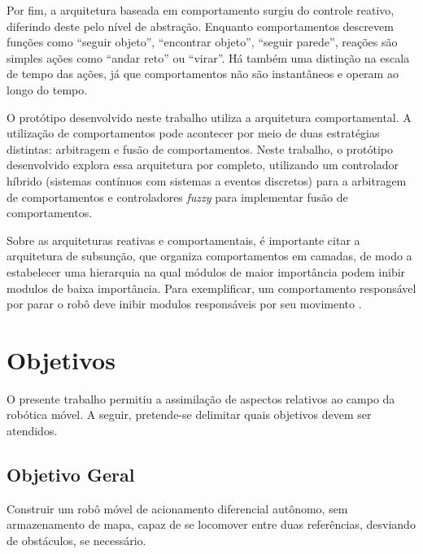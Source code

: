 Por fim, a arquitetura baseada em comportamento surgiu do controle reativo, diferindo
deste pelo nível de abstração. Enquanto comportamentos descrevem funções como
``seguir objeto'', ``encontrar objeto'', ``seguir parede'', reações são simples
ações como ``andar reto'' ou ``virar''. Há também uma distinção na escala de
tempo das ações, já que comportamentos não são instantâneos e operam ao longo do
tempo. 

O protótipo desenvolvido neste trabalho utiliza a arquitetura comportamental. A 
utilização de comportamentos pode acontecer por meio de duas estratégias distintas: 
arbitragem e fusão de comportamentos. Neste trabalho, o protótipo desenvolvido
explora essa arquitetura por completo, utilizando um controlador híbrido (sistemas 
contínuos com sistemas a eventos discretos) para a arbitragem de comportamentos e 
controladores \textit{fuzzy} para implementar fusão de comportamentos.  

Sobre as arquiteturas reativas e comportamentais, é importante citar a arquitetura 
de subsunção, que organiza comportamentos em camadas, de modo a estabelecer uma 
hierarquia na qual módulos de maior importância podem inibir modulos de baixa 
importância. Para exemplificar, um comportamento responsável por parar o robô deve 
inibir modulos responsáveis por seu movimento \cite{Livro_Mataric}.

\section{Objetivos}


O presente trabalho permitiu a assimilação de aspectos relativos ao campo da 
robótica móvel. A seguir, pretende-se delimitar quais objetivos devem ser
atendidos. 

	\subsection{Objetivo Geral}
	
	Construir um robô móvel de acionamento diferencial autônomo, sem
	armazenamento de mapa, capaz de se locomover entre duas referências, desviando
	de obstáculos, se necessário. 
	
 	

